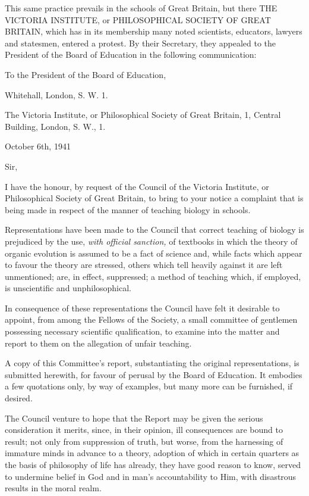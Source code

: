 This same practice prevails in the schools of Great Britain, but there THE VICTORIA
INSTITUTE, or PHILOSOPHICAL SOCIETY OF GREAT BRITAIN, which has in its
membership many noted scientists, educators, lawyers and statesmen, entered a protest. By
their Secretary, they appealed to the President of the Board of Education in the following
communication:

To the President of the Board of Education,

Whitehall, London, S. W. 1.

The Victoria Institute, or Philosophical Society of Great Britain, 1, Central Building,
London, S. W., 1.

October 6th, 1941

Sir,

I have the honour, by request of the Council of the Victoria Institute, or Philosophical
Society of Great Britain, to bring to your notice a complaint that is being made in respect of
the manner of teaching biology in schools.

Representations have been made to the Council that correct teaching of biology is prejudiced
by the use, \textit{with official sanction,} of textbooks in which the theory of organic evolution is
assumed to be a fact of science and, while facts which appear to favour the theory are
stressed, others which tell heavily against it are left unmentioned; are, in effect, suppressed; a
method of teaching which, if employed, is unscientific and unphilosophical.

In consequence of these representations the Council have felt it desirable to appoint, from
among the Fellows of the Society, a small committee of gentlemen possessing necessary
scientific qualification, to examine into the matter and report to them on the allegation of
unfair teaching.

A copy of this Committee's report, substantiating the original representations, is submitted
herewith, for favour of perusal by the Board of Education. It embodies a few quotations only,
by way of examples, but many more can be furnished, if desired.

The Council venture to hope that the Report may be given the serious consideration it merits,
since, in their opinion, ill consequences are bound to result; not only from suppression of
truth, but worse, from the harnessing of immature minds in advance to a theory, adoption of
which in certain quarters as the basis of philosophy of life has already, they have good reason
to know, served to undermine belief in God and in man's accountability to Him, with
disastrous results in the moral realm.

